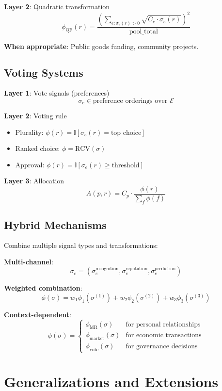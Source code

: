 \documentclass[11pt,a4paper]{article}
\theoremstyle{definition}
\theoremstyle{remark}
\newcommand{\E}{\mathcal{E}}
\begin{document}
\textbf{Layer 2}: Quadratic transformation
\[ \phi_{\text{QF}}(r) = \frac{\left(\sum_{e: \sigma_e(r)>0} \sqrt{C_e \cdot \sigma_e(r)}\right)^2}{\text{pool\_total}} \]

\textbf{When appropriate}: Public goods funding, community projects.

\subsection{Voting Systems}

\textbf{Layer 1}: Vote signals (preferences)
\[ \sigma_e \in \text{preference orderings over } \E \]

\textbf{Layer 2}: Voting rule
\begin{itemize}
\item Plurality: $\phi(r) = \mathbb{I}[\sigma_e(r) = \text{top choice}]$
\item Ranked choice: $\phi = \text{RCV}(\sigma)$
\item Approval: $\phi(r) = \mathbb{I}[\sigma_e(r) \ge \text{threshold}]$
\end{itemize}

\textbf{Layer 3}: Allocation
\[ A(p,r) = C_p \cdot \frac{\phi(r)}{\sum_f \phi(f)} \]

\subsection{Hybrid Mechanisms}

Combine multiple signal types and transformations:

\textbf{Multi-channel}:
\[ \sigma_e = (\sigma_e^{\text{recognition}}, \sigma_e^{\text{reputation}}, \sigma_e^{\text{prediction}}) \]

\textbf{Weighted combination}:
\[ \phi(\sigma) = w_1 \phi_1(\sigma^{(1)}) + w_2 \phi_2(\sigma^{(2)}) + w_3 \phi_3(\sigma^{(3)}) \]

\textbf{Context-dependent}:
\[ \phi(\sigma) = \begin{cases}
\phi_{\text{MR}}(\sigma) & \text{for personal relationships} \\
\phi_{\text{market}}(\sigma) & \text{for economic transactions} \\
\phi_{\text{vote}}(\sigma) & \text{for governance decisions}
\end{cases} \]

\section{Generalizations and Extensions}
\end{document}
